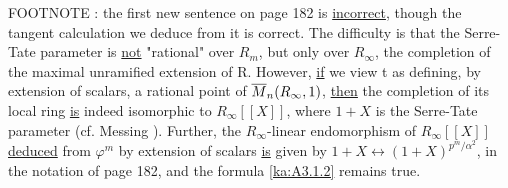 \begin{kathmstar}{FOOTNOTE :}
the first new sentence on page 182 is \uline{incorrect}, though the tangent
calculation we deduce from it is correct. The difficulty is that the
Serre-Tate parameter is \uline{not} "rational" over $R_m$, but only over
$R_\infty$, the completion of the maximal unramified extension of R. However,
\uline{if} we view t as defining, by extension of scalars, a rational point of
$\overline{M}_n(R_\infty,1)$, \uline{then} the completion of its local ring
\uline{is} indeed isomorphic to $R_\infty[[X]]$, where $1+X$ is the Serre-Tate
parameter (cf. Messing \cite{messing72}). Further, the $R_\infty$-linear endomorphism of
$R_\infty[[X]]$ \uline{deduced} from $\varphi^m$ by extension of scalars
\uline{is} given by $1+X\longleftrightarrow (1+X)^{p^m/\alpha^2}$, in the
notation of page 182, and the formula \eqref{ka:A3.1.2} remains true.
\end{kathmstar}
